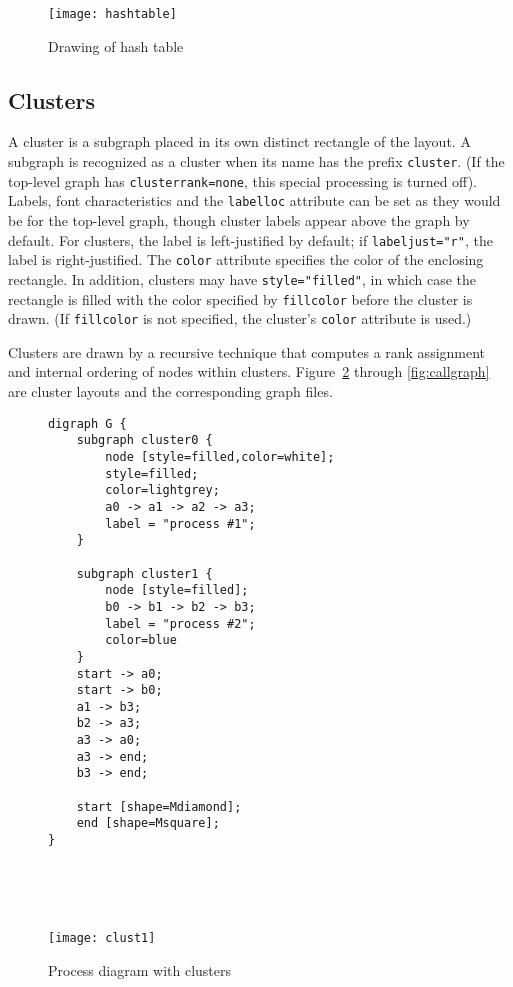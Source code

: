 \documentclass[11pt]{article}
\begin{document}
{\begin{figure}[p]
	\centerline {
		\texttt{[image: hashtable]}
	}
    \caption{Drawing of hash table}
    \label{fig:hashtabledrawing}
\end{figure}

\subsection{Clusters}

A cluster is a subgraph placed in its own distinct rectangle of the layout.
A subgraph is recognized as a cluster when its name has the prefix
\verb"cluster". (If the top-level graph has {\tt clusterrank=none},
this special processing is turned off).
Labels, font characteristics and the {\tt labelloc} attribute can 
be set as they would be for the top-level graph, though
cluster labels appear above the graph by default. 
For clusters, the label is left-justified by default;
if {\tt labeljust="r"}, the label is right-justified.
The {\tt color} attribute specifies the color of the enclosing rectangle.
In addition, clusters may have {\tt style="filled"}, in which case
the rectangle is filled with the color specified by {\tt fillcolor}
before the cluster is drawn. (If  {\tt fillcolor} is not specified,
the cluster's {\tt color} attribute is used.)

Clusters are drawn by a recursive technique that computes a
rank assignment and internal ordering of nodes within clusters.
Figure~\ref{fig:clust1} through \ref{fig:callgraph} are cluster layouts
and the corresponding graph files.

\begin{figure}[p]
\begin{minipage}[t]{2.5in}
\footnotesize
\begin{verbatim}
digraph G {
    subgraph cluster0 {
        node [style=filled,color=white];
        style=filled;
        color=lightgrey;
        a0 -> a1 -> a2 -> a3;
        label = "process #1";
    }

    subgraph cluster1 {
        node [style=filled];
        b0 -> b1 -> b2 -> b3;
        label = "process #2";
        color=blue
    }
    start -> a0;
    start -> b0;
    a1 -> b3;
    b2 -> a3;
    a3 -> a0;
    a3 -> end;
    b3 -> end;

    start [shape=Mdiamond];
    end [shape=Msquare];
}
\end{verbatim}
\end{minipage} \hspace{0.05in} \
\parbox[t]{2.0in}{
    \ \\
	\centerline {
		\texttt{[image: clust1]}
	}
}
    \caption{Process diagram with clusters}
    \label{fig:clust1}
\end{figure}
\clearpage

}
\end{document}
